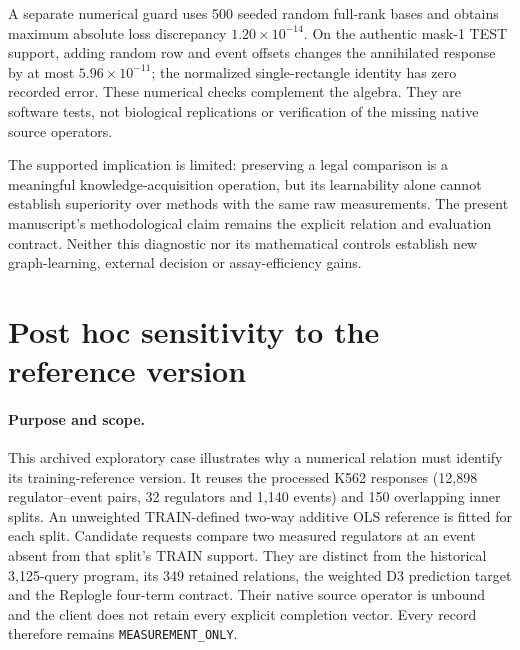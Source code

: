 \documentclass[11pt]{article}
\begin{document}
A separate numerical guard uses 500 seeded random full-rank bases and obtains maximum absolute loss discrepancy $1.20\times10^{-14}$. On the authentic mask-1 TEST support, adding random row and event offsets changes the annihilated response by at most $5.96\times10^{-11}$; the normalized single-rectangle identity has zero recorded error. These numerical checks complement the algebra. They are software tests, not biological replications or verification of the missing native source operators.

The supported implication is limited: preserving a legal comparison is a meaningful knowledge-acquisition operation, but its learnability alone cannot establish superiority over methods with the same raw measurements. The present manuscript's methodological claim remains the explicit relation and evaluation contract. Neither this diagnostic nor its mathematical controls establish new graph-learning, external decision or assay-efficiency gains.


\clearpage
\section{Post hoc sensitivity to the reference version}
\label{sec:referenceversion}
\paragraph{Purpose and scope.}
This archived exploratory case illustrates why a numerical relation must identify its training-reference version. It reuses the processed K562 responses (12,898 regulator--event pairs, 32 regulators and 1,140 events) and 150 overlapping inner splits. An unweighted TRAIN-defined two-way additive OLS reference is fitted for each split. Candidate requests compare two measured regulators at an event absent from that split's TRAIN support. They are distinct from the historical 3,125-query program, its 349 retained relations, the weighted D3 prediction target and the Replogle four-term contract. Their native source operator is unbound and the client does not retain every explicit completion vector. Every record therefore remains \texttt{MEASUREMENT\_ONLY}.
\end{document}
